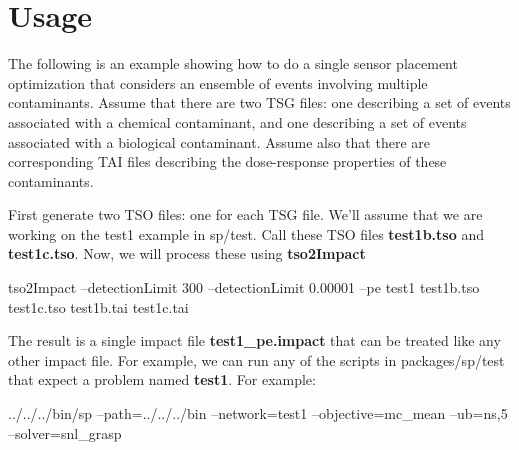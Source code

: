 \section{Usage}\label{multiplecontaminants_multiple_contaminantsUsage}
The following is an example showing how to do a single sensor placement optimization that considers an ensemble of events involving multiple contaminants. Assume that there are two TSG files: one describing a set of events associated with a chemical contaminant, and one describing a set of events associated with a biological contaminant. Assume also that there are corresponding TAI files describing the dose-\/response properties of these contaminants.

First generate two TSO files: one for each TSG file. We'll assume that we are working on the test1 example in sp/test. Call these TSO files {\bfseries test1b.tso} and {\bfseries test1c.tso}. Now, we will process these using {\bfseries tso2Impact}

\begin{verb}
   tso2Impact --detectionLimit 300 --detectionLimit 0.00001 --pe test1 test1b.tso test1c.tso test1b.tai test1c.tai
\end{verb}


The result is a single impact file {\bfseries test1\_\-pe.impact} that can be treated like any other impact file. For example, we can run any of the scripts in packages/sp/test that expect a problem named {\bfseries test1}. For example: \begin{verb}
   ../../../bin/sp --path=../../../bin --network=test1 --objective=mc_mean --ub=ns,5 --solver=snl_grasp
\end{verb}
 
